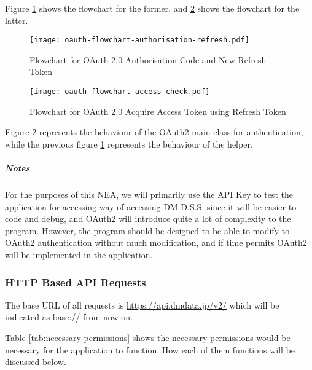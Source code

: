 Figure \ref{fig:oauth-flowchart-authorisation-refresh} shows the flowchart for the former, and \ref{fig:oauth-flowchart-access-check} shows the flowchart for the latter.

\begin{figure}[htp]
    \centering
    \texttt{[image: oauth-flowchart-authorisation-refresh.pdf]}
    \caption{Flowchart for OAuth 2.0 Authorisation Code and New Refresh Token}
    \label{fig:oauth-flowchart-authorisation-refresh}
\end{figure}

\begin{figure}[htp]
    \centering
    \texttt{[image: oauth-flowchart-access-check.pdf]}
    \caption{Flowchart for OAuth 2.0 Acquire Access Token using Refresh Token}
    \label{fig:oauth-flowchart-access-check}
\end{figure}

Figure \ref{fig:oauth-flowchart-access-check} represents the behaviour of the OAuth2 main class for authentication, while the previous figure \ref{fig:oauth-flowchart-authorisation-refresh} represents the behaviour of the helper.

\subparagraph{Notes}

For the purposes of this NEA, we will primarily use the API Key to test the application for accessing  way of accessing DM-D.S.S. since it will be easier to code and debug, and OAuth2 will introduce quite a lot of complexity to the program. However, the program should be designed to be able to modify to OAuth2 authentication without much modification, and if time permits OAuth2 will be implemented in the application.

\subsubsection{HTTP Based API Requests}

The base URL of all requests is \url{https://api.dmdata.jp/v2/} which will be indicated as \url{base://} from now on.

Table \ref{tab:necessary-permissions} shows the necessary permissions would be necessary for the application to function. How each of them functions will be discussed below.

